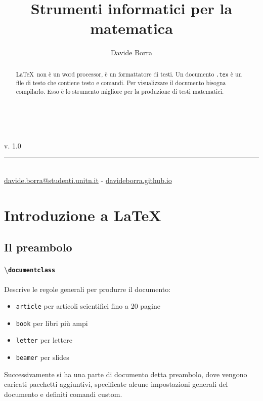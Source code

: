 \documentclass{article}     %
\title{Strumenti informatici per la matematica}
\author{Davide Borra}
\date{}
\makeatletter
\let\runauthor\@author
\let\runtitle\@title
\makeatother
\begin{document}
\lhead{}
\chead{}
\rfoot{\runauthor}

\begin{titlepage}
    \pagestyle{empty}
    \begin{center}
        \vspace*{\fill}
        \vspace{0.5cm}
        \textbf{\Huge \runtitle}\\\vspace{5mm}
        \textsc{\Large \runauthor}
        \vspace{5cm}
    \end{center}
    \vspace*{\fill}
    v. 1.0\\
    \rule{0.8\linewidth}{0.5mm}\\
    {\footnotesize\href{mailto:davide.borra@studenti.unitn.it}{davide.borra@studenti.unitn.it} - \href{http://davideborra.github.io}{davideborra.github.io}}
    \restoregeometry
\end{titlepage}
\thispagestyle{empty}

    \tableofcontents
    \creativecommons

\lhead{\runtitle}
\chead{}
\rhead{\rightmark}
\rfoot{\runauthor}
\newpage
\begin{abstract}
    \LaTeX \ non è un word processor, è un formattatore di testi. Un documento \texttt{.tex} è un file di testo che contiene testo e comandi. Per visualizzare il documento bisogna compilarlo. Esso è lo strumento migliore per la produzione di testi matematici.
\end{abstract}
\section{Introduzione a \LaTeX}
\subsection{Il preambolo}
\paragraph{\textbackslash\texttt{documentclass}} Descrive le regole generali per produrre il documento:
\begin{itemize}
    \item \texttt{article} per articoli scientifici fino a 20 pagine
    \item \texttt{book} per libri più ampi
    \item \texttt{letter} per lettere
    \item \texttt{beamer} per slides
\end{itemize}
Successivamente si ha una parte di documento detta preambolo, dove vengono caricati pacchetti aggiuntivi, specificate alcune impostazioni generali del documento e definiti comandi custom.
\end{document}
